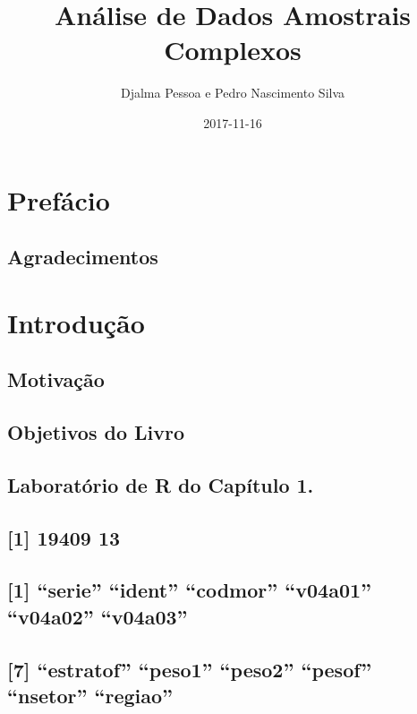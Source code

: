 \documentclass[]{book}
\title{Análise de Dados Amostrais Complexos}
\author{Djalma Pessoa e Pedro Nascimento Silva}
\date{2017-11-16}
\theoremstyle{definition}
\theoremstyle{definition}
\theoremstyle{definition}
\theoremstyle{remark}
\begin{document}
\maketitle

{
\setcounter{tocdepth}{1}
\tableofcontents
}
\chapter*{Prefácio}\label{prefacio}

\section*{Agradecimentos}\label{agradecimentos}

\chapter{Introdução}\label{introduc}

\section{Motivação}\label{motivacao}

\section{Objetivos do Livro}\label{objetivos-do-livro}

\section{Laboratório de R do Capítulo 1.}\label{epa}

\section{{[}1{]} 19409 13}\label{section}

\section{\texorpdfstring{{[}1{]} ``serie'' ``ident'' ``codmor''
``v04a01'' ``v04a02''
``v04a03''}{{[}1{]} serie ident codmor v04a01 v04a02 v04a03}}\label{serie-ident-codmor-v04a01-v04a02-v04a03}

\section{\texorpdfstring{{[}7{]} ``estratof'' ``peso1'' ``peso2''
``pesof'' ``nsetor''
``regiao''}{{[}7{]} estratof peso1 peso2 pesof nsetor regiao}}\label{estratof-peso1-peso2-pesof-nsetor-regiao}
\end{document}
